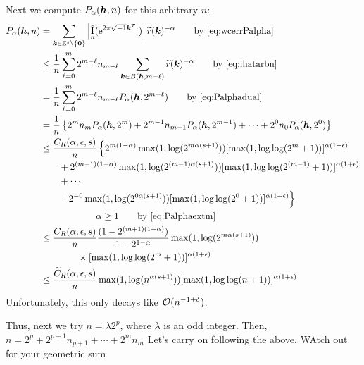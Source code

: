 \documentclass{amsart}
\newcommand{\tr}{\widetilde{r}}
\DeclareMathOperator{\appxint}{\hat{I}}
\newcommand{\FredNote}[1]{{\color{blue}#1}}
\begin{document}
Next we compute $P_\alpha(\boldsymbol{h},n)$ for this arbitrary $n$:
\begin{align*}
      P_\alpha(\vh,n) & = \sum_{\vk \in \integers^s \setminus\{\vzero\}} \abs{\appxint_n(\me^{2 \pi \sqrt{-1} \vk^T \cdot})}\tr(\vk)^{-\alpha} \qquad \text{by \eqref{eq:wcerrPalpha}} \\
      & \le \frac {1}{n} \sum_{\ell = 0}^{m} 2^{m-\ell} n_{m - \ell} \sum_{\vk \in B(\vh,m-\ell)} \tr(\vk)^{-\alpha}
      \qquad \text{by \eqref{eq:ihatarbn}}\\
      & = \frac {1}{n} \sum_{\ell = 0}^{m} 2^{m-\ell} n_{m - \ell} P_\alpha(\vh,2^{m-\ell})
      \qquad \text{by \eqref{eq:Palphadual}}\\
      & =  \frac {1}{n} \left\{ 2^m n_m P_\alpha(\vh,2^m) + 2^{m-1} n_{m-1} P_\alpha(\vh,2^{m-1}) + \cdots + 2^0 n_0 P_\alpha(\vh,2^0)  \right\} \\
      & \le \frac {C_{R}(\alpha,\epsilon,s)}{n} \left\{ 2^{m(1-\alpha)}\max(1, \log(2^{m\alpha(s+1)})) [\max(1,\log \log (
    2^m+1))]^{\alpha(1+\epsilon)}\right .\\ 
      & \qquad  + 2^{(m-1)(1-\alpha)}\max(1, \log(2^{(m-1)\alpha(s+1)})) [\max(1,\log \log (
    2^{(m-1)}+1))]^{\alpha(1+\epsilon)}\\
      & \qquad + \cdots \\
      & \qquad  \left . + 2^{-0}\max(1, \log(2^{0\alpha(s+1)})) [\max(1,\log \log (
    2^{0}+1))]^{\alpha(1+\epsilon)} \right\}\\
      & \qquad \qquad \qquad \alpha \ge 1 \qquad \text{by \eqref{eq:Palphaextm}}\\
      & \le \frac {C_{R}(\alpha,\epsilon,s)}{n} \frac{(1 - 2^{(m+1)(1-\alpha)})}{1 - 2^{1-\alpha}}
      \max(1, \log(2^{m\alpha(s+1)})) \\
      & \qquad \qquad \times [\max(1,\log \log (
    2^m+1))]^{\alpha(1+\epsilon)} \\
      & \le \frac {\widetilde{C}_{R}(\alpha,\epsilon,s)}{n}
      \max(1, \log(n^{\alpha(s+1)}))
      [\max(1,\log \log (
    n+1))]^{\alpha(1+\epsilon)}
\end{align*}
Unfortunately, this only decays like $\operatorname{{\mathcal O}}(n^{-1+\delta})$.


Thus, next we try $n = \lambda 2^p$, where $\lambda$ is an odd integer. Then, $n = 2^p + 2^{p+1}n_{p+1} + \cdots + 2^m n_m$
\FredNote{Let's carry on following the above.  WAtch out for your geometric sum} \\
\end{document}
